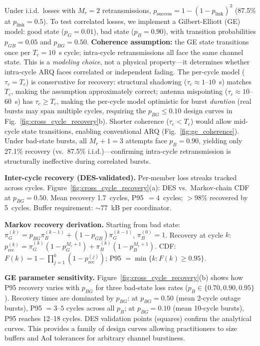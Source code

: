 \documentclass[journal]{IEEEtran}
\begin{document}
Under i.i.d.\ losses with $M_r = 2$ retransmissions, $p_{\text{success}} = 1 - (1 - p_{\text{link}})^{3}$ (87.5\% at $p_{\text{link}} = 0.5$). To test correlated losses, we implement a Gilbert-Elliott (GE) model: good state ($p_G = 0.01$), bad state ($p_B = 0.90$), with transition probabilities $p_{GB} = 0.05$ and $p_{BG} = 0.50$. \textbf{Coherence assumption:} the GE state transitions once per $T_c = 10$~s cycle; intra-cycle retransmissions all face the same channel state. This is a \emph{modeling choice}, not a physical property---it determines whether intra-cycle ARQ faces correlated or independent fading. The per-cycle model ($\tau_c = T_c$) is conservative for recovery: structural shadowing ($\tau_c \approx 1$--$10$~s) matches $T_c$, making the assumption approximately correct; antenna mispointing ($\tau_c \approx 10$--$60$~s) has $\tau_c \geq T_c$, making the per-cycle model optimistic for burst \emph{duration} (real bursts may span multiple cycles, requiring the $p_{BG} \leq 0.10$ design curves in Fig.~\ref{fig:cross_cycle_recovery}b). Shorter coherence ($\tau_c < T_c$) would allow mid-cycle state transitions, enabling conventional ARQ (Fig.~\ref{fig:ge_coherence}). Under bad-state bursts, all $M_r + 1 = 3$ attempts face $p_B = 0.90$, yielding only 27.1\% recovery (vs.\ 87.5\% i.i.d.)---confirming intra-cycle retransmission is structurally ineffective during correlated bursts.

\textbf{Inter-cycle recovery (DES-validated).} Per-member loss streaks tracked across cycles. Figure~\ref{fig:cross_cycle_recovery}(a): DES vs.\ Markov-chain CDF at $p_{BG} = 0.50$. Mean recovery 1.7~cycles, P95~$= 4$~cycles; $>$98\% recovered by 5~cycles. Buffer requirement: ${\sim}77$~kB per coordinator.

\textbf{Markov recovery derivation.} Starting from bad state: $\pi_G^{(k)} = p_{BG} \pi_B^{(k-1)} + (1 - p_{GB}) \pi_G^{(k-1)}$, $\pi_B^{(0)} = 1$. Recovery at cycle $k$: $p_{\text{rec}}^{(k)} = \pi_G^{(k)}(1 - p_G^{M_r+1}) + \pi_B^{(k)}(1 - p_B^{M_r+1})$. CDF: $F(k) = 1 - \prod_{j=1}^{k}(1 - p_{\text{rec}}^{(j)})$; P95 $= \min\{k : F(k) \geq 0.95\}$.

\textbf{GE parameter sensitivity.} Figure~\ref{fig:cross_cycle_recovery}(b) shows how P95 recovery varies with $p_{BG}$ for three bad-state loss rates ($p_B \in \{0.70, 0.90, 0.95\}$). Recovery times are dominated by $p_{BG}$: at $p_{BG} = 0.50$ (mean 2-cycle outage bursts), P95 $= 3$--$5$ cycles across all $p_B$; at $p_{BG} = 0.10$ (mean 10-cycle bursts), P95 reaches 12--18 cycles. DES validation points (squares) confirm the analytical curves. This provides a family of design curves allowing practitioners to size buffers and AoI tolerances for arbitrary channel burstiness.
\end{document}
